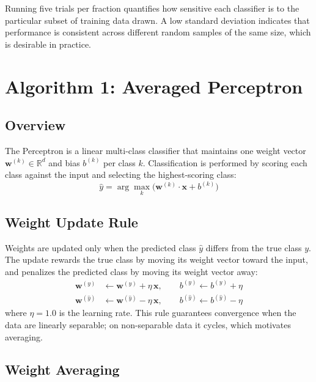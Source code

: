 \documentclass[12pt]{article}
\begin{document}
Running five trials per fraction quantifies how sensitive each classifier is to the
particular subset of training data drawn. A low standard deviation indicates that
performance is consistent across different random samples of the same size, which is
desirable in practice.

\section{Algorithm 1: Averaged Perceptron}
\label{sec:perceptron}

\subsection{Overview}

The Perceptron is a linear multi-class classifier that maintains one weight vector
$\mathbf{w}^{(k)} \in \mathbb{R}^d$ and bias $b^{(k)}$ per class $k$. Classification is
performed by scoring each class against the input and selecting the highest-scoring class:
\[
  \hat{y} = \arg\max_{k} \bigl(\mathbf{w}^{(k)} \cdot \mathbf{x} + b^{(k)}\bigr)
\]

\subsection{Weight Update Rule}

Weights are updated only when the predicted class $\hat{y}$ differs from the true class
$y$. The update rewards the true class by moving its weight vector toward the input, and
penalizes the predicted class by moving its weight vector away:
\begin{align*}
  \mathbf{w}^{(y)} &\leftarrow \mathbf{w}^{(y)} + \eta\,\mathbf{x},
  \qquad b^{(y)} \leftarrow b^{(y)} + \eta \\
  \mathbf{w}^{(\hat{y})} &\leftarrow \mathbf{w}^{(\hat{y})} - \eta\,\mathbf{x},
  \qquad b^{(\hat{y})} \leftarrow b^{(\hat{y})} - \eta
\end{align*}
where $\eta = 1.0$ is the learning rate. This rule guarantees convergence when the data
are linearly separable; on non-separable data it cycles, which motivates averaging.

\subsection{Weight Averaging}
\end{document}
